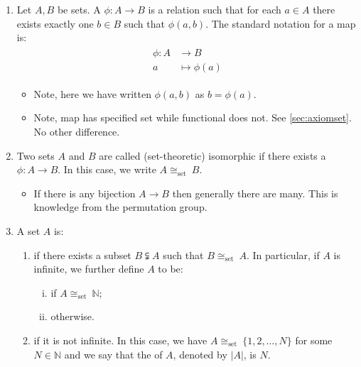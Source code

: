 \documentclass{article}
\begin{document}
\begin{enumerate}
    \item  Let $A, B$ be sets. A  $\phi: A \rightarrow B$ is a relation such that for each $a \in A$ there exists exactly one $b \in B$ such that $\phi(a, b)$.
The standard notation for a map is:
\begin{align*}
\begin{aligned}
\phi: A & \rightarrow B \\
a & \mapsto \phi(a)
\end{aligned}
\end{align*}
\begin{itemize}
    \item Note, here we have written $\phi(a, b)$  as $b= \phi(a)$. 
    \item Note, map has specified set while functional does not. See \cref{sec:axiomset}. No other difference.
\end{itemize}

\item {} Two sets $A$ and $B$ are called (set-theoretic) isomorphic if there exists a  $\phi: A \rightarrow B$. In this case, we write $A \cong_{\text {set }} B$.
\begin{itemize}
    \item If there is any bijection $A \rightarrow B$ then generally there are many. This is knowledge from the permutation group.
\end{itemize}

\item {} A set $A$ is: 
\begin{enumerate}
    \item {} if there exists a  subset $B \subsetneqq A$ such that $B \cong_{\text {set }} A$. In particular, if $A$ is infinite, we further define $A$ to be:
    \begin{enumerate}[i).]
        \item {} if $A \cong_{\text {set }} \mathbb{N}$;
        \item {} otherwise.
    \end{enumerate}
    \item  {} if it is not infinite. In this case, we have $A  \cong_{\text {set }}\{1,2, \ldots, N\}$ for some $N \in \mathbb{N}$ and we say that the  of $A$, denoted by $|A|$, is $N$.
\end{enumerate}


\end{enumerate}
\end{document}
